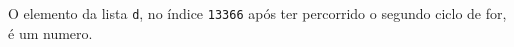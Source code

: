 \documentclass[12pt,varwidth=16cm,border=1pt]{standalone}
\begin{document}
O elemento da lista \verb+d+, no índice \verb+13366+ após ter percorrido o segundo ciclo de for, é um numero.

\questiomtrue
\end{document}
